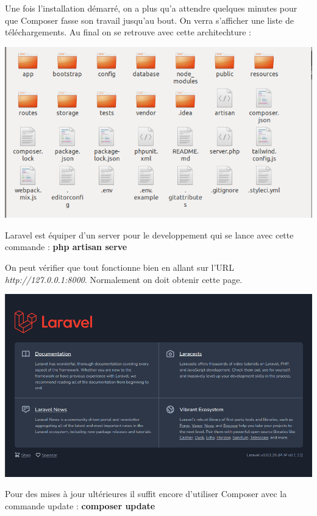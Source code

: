 \documentclass[12pt,a4paper]{article}
\begin{document}
Une fois l'installation démarré, on a plus qu'a attendre quelques minutes pour que Composer fasse son travail jusqu'au bout. On verra s'afficher une liste de téléchargements. Au final on se retrouve avec cette architechture :

\begin{center}
\includegraphics[scale=0.7]{img/groot.png}
\end{center}

Laravel est équiper d'un server pour le developpement qui se lance avec cette commande :
\textbf{php artisan serve}

On peut vérifier que tout fonctionne bien en allant sur l'URL \textit{http://127.0.0.1:8000}. Normalement on doit obtenir cette page.

\begin{center}
\includegraphics[scale=0.5]{img/laravel_home.png}
\end{center}

Pour des mises à jour ultérieures il suffit encore d'utiliser Composer avec la commande update : \textbf{composer update}
\end{document}
